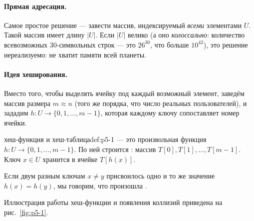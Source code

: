 \paragraph*{Прямая адресация.} Самое простое решение --- завести массив, индексируемый \emph{всеми} элементами $U$. Такой массив имеет длину $|U|$. Если $|U|$ велико (а оно \emph{колоссально}: количество всевозможных 30-символьных строк --- это $26^{30}$, что больше $10^{42}$), это решение нереализуемо: не хватит памяти всей планеты.

\paragraph*{Идея хеширования.} Вместо того, чтобы выделять ячейку под каждый возможный элемент, заведём массив размера $m \approx n$ (того же порядка, что число реальных пользователей), и зададим  $h: U \to \{0, 1, \dots, m-1\}$, которая каждому ключу сопоставляет номер ячейки.

\begin{definition}{хеш-функция и хеш-таблица}{def:p5-1}
 --- это произвольная функция $h: U \to \{0, 1, \dots, m-1\}$. По ней строится : массив $T[0], T[1], \dots, T[m-1]$. Ключ $x \in U$ хранится в ячейке $T[h(x)]$.

Если двум разным ключам $x \ne y$ присвоилось одно и то же значение $h(x) = h(y)$, мы говорим, что произошла .
\end{definition}

Иллюстрация работы хеш-функции и появления коллизий приведена на рис.~\ref{fig:p5-1}.

